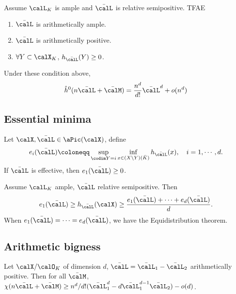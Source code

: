 \begin{theorem}[label=\labelNFM{thm:cre}, status=draft, tag=0000000]
	Assume $\calL_K$ is ample and $\bar{\calL}$ is relative semipositive. TFAE
	\begin{enumerate}
		\item $\bar{\calL}$ is arithmetically ample.
		\item $\bar{\calL}$ is arithmetically positive.
		\item $\forall Y \subset \calX_K$, $h_{\bar{\calL}}(Y) \geq 0$.
	\end{enumerate}
\end{theorem}

Under these condition above,
\[ \hat{h}^0(n \bar{\calL} + \bar{\calM}) = \frac{n^d}{d!} \bar{\calL}^d + o(n^d) \]

\subsection[status=draft,tag=0000000,label=\labelNFM{subsec:essmin}]{Essential minima}

Let $\calX,\bar{\calL} \in \aPic(\calX)$, define
\[ e_i(\bar{\calL}) \coloneqq \sup_{\codim Y = i} \inf_{x \in (X\setminus Y)(\bar{K})} h_{\bar{\calL}}(x), \quad i = 1,\cdots,d. \]
If $\bar{\calL}$ is effective, then $e_1(\bar{\calL}) \geq 0$.

\begin{theorem}[label=\labelNFM{thm:fundomental-inequality}, status=draft, tag=0000000]
	Assume $\calL_K$ ample, $\bar{\calL}$ relative semipositive.
	Then
	\[ e_1(\bar{\calL}) \geq h_{\bar{\calL}}(\calX) \geq \frac{e_1(\bar{\calL})+\cdots+e_d(\bar{\calL})}{d}. \]
	When $e_1(\bar{\calL}) = \cdots = e_d(\bar{\calL})$, we have the Equidistribution theorem.
\end{theorem}


\subsection[status=draft,tag=0000000,label=\labelNFM{subsec:big}]{Arithmetic bigness}

\begin{theorem}[label=\labelNFM{thm:yuan}, status=draft, tag=0000000]
	Let $\calX/\calO_K$ of dimension $d$, $\bar{\calL} = \bar{\calL}_1 - \bar{\calL}_2$ arithmetically positive.
	Then for all $\bar{\calM}$, $\chi(n\bar{\calL}+\bar{\calM}) \geq n^d/d! (\bar{\calL}_1^d - d \bar{\calL}_1^{d-1} \bar{\calL}_2) - o(d)$.
\end{theorem}

